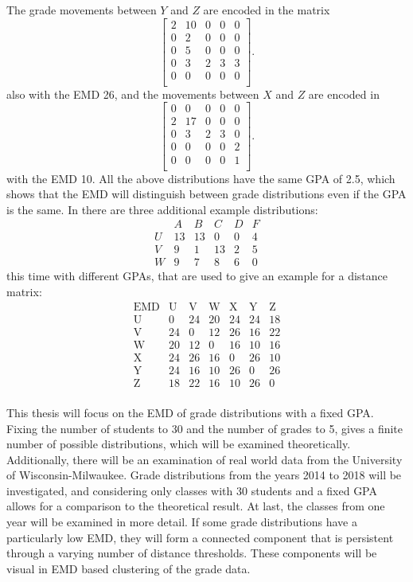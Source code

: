 \documentclass[12pt,letterpaper,oneside,openany]{book}
\begin{document}
The grade movements between $Y$ and $Z$ are encoded in the matrix
\[
\left[
\begin{array}{ccccc}
2 & 10 & 0 & 0 & 0 \\
0 & 2 & 0 & 0 & 0 \\
0 & 5 & 0 & 0 & 0 \\
0 & 3 & 2 & 3 & 3 \\
0 & 0 & 0 & 0 & 0 \\
\end{array}
\right].
\]
also with the EMD 26, and the movements between $X$ and $Z$ are encoded in
\[
\left[
\begin{array}{ccccc}
0 & 0 & 0 & 0 & 0 \\
2 & 17 & 0 & 0 & 0 \\
0 & 3 & 2 & 3 & 0 \\
0 & 0 & 0 & 0 & 2 \\
0 & 0 & 0 & 0 & 1 \\
\end{array}
\right].
\]
with the EMD 10.
All the above distributions have the same GPA of 2.5, which shows that the EMD will distinguish between grade distributions even if the GPA is the same.
In \cite{bourn2019expected} there are three additional example distributions:
\[
\begin{array}{c|ccccc}
& A &  B & C &  D & F \\ \hline
U& 13& 13& 0& 0& 4 \\
V& 9& 1& 13& 2& 5 \\
W& 9& 7& 8& 6& 0
\end{array}
\]
this time with different GPAs, that are used to give an example for a distance matrix:
\[
\begin{array}{c|cccccc}
\text{EMD} & \text{U} & \text{V} & \text{W} & \text{X} & \text{Y} & \text{Z} \\ \hline
\text{U} & 0 & 24 & 20 & 24 & 24 & 18 \\
\text{V} & 24 & 0 & 12 & 26 & 16 & 22 \\
\text{W} & 20 & 12 & 0 & 16 & 10 & 16 \\
\text{X} & 24 & 26 & 16 & 0 & 26 & 10 \\
\text{Y} & 24 & 16 & 10 & 26 & 0 & 26 \\
\text{Z} & 18 & 22 & 16 & 10 & 26 & 0 \\
\end{array}
\]

This thesis will focus on the EMD of grade distributions with a fixed GPA. Fixing the number of students to 30 and the number of grades to 5, gives a finite number of possible distributions, which will be examined theoretically. 
Additionally, there will be an examination of real world data from the University of Wisconsin-Milwaukee. Grade distributions from the years 2014 to 2018 will be investigated, and considering only classes with 30 students and a fixed GPA allows for a comparison to the theoretical result.
At last, the classes from one year will be examined in more detail. If some grade distributions have a particularly low EMD, they will form a connected component that is persistent through a varying number of distance thresholds. These components will be visual in EMD based clustering of the grade data.
\end{document}
